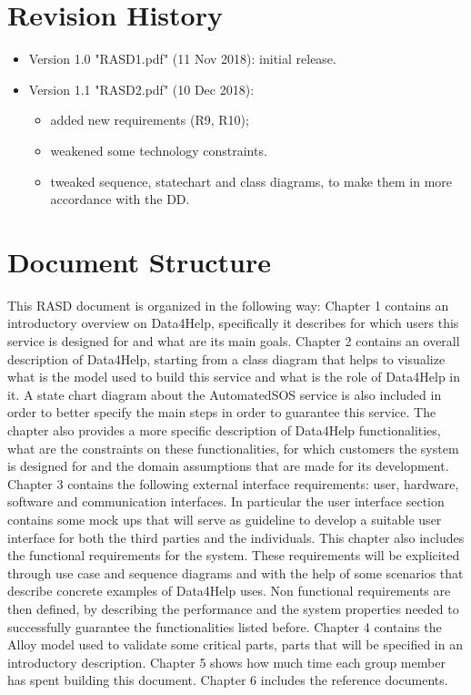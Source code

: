 \section{Revision History}

\begin{itemize}
\item Version 1.0 "RASD1.pdf" (11 Nov 2018): initial release.
\item Version 1.1 "RASD2.pdf" (10 Dec 2018): 
	\begin{itemize}
	\item added new requirements (R9, R10);
	\item weakened some technology constraints.
	\item tweaked sequence, statechart and class diagrams, to make them in more accordance with the DD.
	\end{itemize}
\end{itemize}

\section{Document Structure}
This RASD document is organized in the following way:
Chapter 1 contains an introductory overview on Data4Help, specifically it describes for which users this service is designed for and what are its main goals.
\givespace
Chapter 2 contains an overall description of Data4Help, starting from a class diagram that helps to visualize what is the model used to build this service and what is the role of Data4Help in it. A state chart diagram about the AutomatedSOS service is also included in order to better specify the main steps in order to guarantee this service. The chapter also provides a more specific description of Data4Help functionalities, what are the constraints on these functionalities, for which customers the system is designed for and the domain assumptions that are made for its development.
\givespace
Chapter 3 contains the following external interface requirements: user, hardware, software and communication interfaces. In particular the user interface section contains some mock ups that will serve as guideline to develop a suitable user interface for both the third parties and the individuals. 
This chapter also includes the functional requirements for the system. These requirements will be explicited through use case and sequence diagrams and with the help of some scenarios that describe concrete examples of Data4Help uses.
Non functional requirements are then defined, by describing the performance and the system properties needed to successfully guarantee the functionalities listed before.
\givespace
Chapter 4 contains the Alloy model used to validate some critical parts, parts that will be specified in an introductory description.
\givespace
Chapter 5 shows how much time each group member has spent building this document.
\givespace
Chapter 6 includes the reference documents.